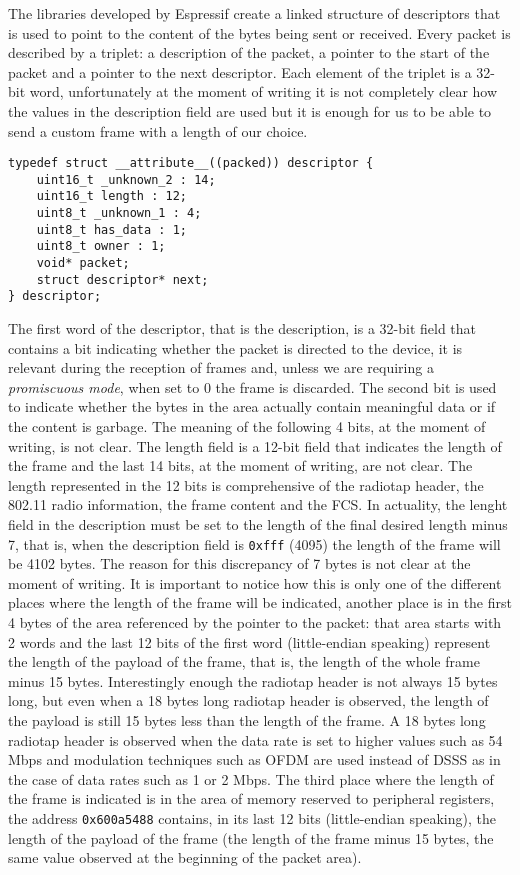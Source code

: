 The libraries developed by Espressif create a linked structure of descriptors that
is used to point to the content of the bytes being sent or received.
Every packet is described by a triplet: a description of the packet, a pointer to the start of the packet
and a pointer to the next descriptor. Each element of the triplet is a 32-bit word, unfortunately
at the moment of writing it is not completely clear how the values in the description field are used
but it is enough for us to be able to send a custom frame with a length of our choice.
\newsavebox{\descriptor}
\begin{lrbox}{\descriptor}
\begin{lstlisting}
typedef struct __attribute__((packed)) descriptor {
	uint16_t _unknown_2 : 14;
	uint16_t length : 12;
	uint8_t _unknown_1 : 4;
	uint8_t has_data : 1;
	uint8_t owner : 1;
	void* packet;
	struct descriptor* next;
} descriptor;
\end{lstlisting}
\end{lrbox}
\usebox{\descriptor}
The first word of the descriptor, that is the description, is a 32-bit field 
that contains a bit indicating whether the packet is directed to the device,
it is relevant during the reception of frames and, unless we
are requiring a \textit{promiscuous mode}, when set to 0 the frame is discarded.
The second bit is used to indicate whether the bytes in the area actually contain 
meaningful data or if the content is garbage. The meaning of the following 4 bits, at the moment
of writing, is not clear. 
The length field is a 12-bit field that indicates the length of the frame and the last 14 bits,
at the moment of writing, are not clear.
The length represented in the 12 bits is comprehensive of the radiotap header, 
the 802.11 radio information, the frame content and the FCS.
In actuality, the lenght field in the description must be set to the length of the final desired
length minus 7, that is, when the description field is \texttt{0xfff} (4095) the length of the frame
will be 4102 bytes. The reason for this discrepancy of 7 bytes is not clear at the moment of writing.
It is important to notice how this is only one of the different places where the length of the frame
will be indicated, another place is in the first 4 bytes of the area referenced by the pointer to the packet:
that area starts with 2 words and the last 12 bits of the first word (little-endian speaking)
represent the length of the payload of the frame, that is, the length of the whole frame minus 15 bytes. 
Interestingly enough the radiotap header is not always 15 bytes long, but even when a 18 bytes 
long radiotap header is observed, the length of the payload is still 15 bytes less than the length of the frame.
A 18 bytes long radiotap header is observed when the data rate is set to higher values such as 54 Mbps
and modulation techniques such as OFDM are used instead of DSSS as in the case of data rates such as 1 or 2 Mbps. 
The third place where the length of the frame is indicated is in the area of memory reserved to
peripheral registers, the address \texttt{0x600a5488} contains, in its last 12 bits (little-endian speaking),
the length of the payload of the frame (the length of the frame minus 15 bytes, the same value observed
at the beginning of the packet area).
